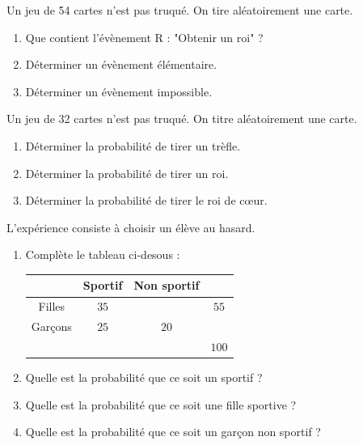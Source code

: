 \begin{pageAD} 


 
 
Un jeu de 54 cartes n'est pas truqué. On tire aléatoirement une carte.
\begin{enumerate}
\item Que contient l'évènement R : "Obtenir un roi" ?
\item Déterminer un évènement élémentaire. 
\item Déterminer un évènement impossible.
\end{enumerate}




 
 
Un jeu de 32 cartes n'est pas truqué. On titre aléatoirement une carte.
\begin{enumerate}
\item Déterminer la probabilité de tirer un trèfle.
\item Déterminer la probabilité de tirer un roi.
\item Déterminer la probabilité de tirer le roi de cœur.
\end{enumerate}
 

 
 


L'expérience consiste à choisir un élève au hasard. 

\begin{enumerate}
\item Complète le tableau ci-desous :

\begin{tabular}{|c|c|c|c|}
\hline 
 & Sportif & Non sportif &  \\ 
\hline 
Filles & $35$ &   & $55$ \\ 
\hline 
Garçons & $25$ & $20$ &  \\ 
\hline 
 &  &  & $100$ \\ 
\hline 
\end{tabular} 


\item Quelle est la probabilité que ce soit un sportif ? 
\item Quelle est la probabilité que ce soit une fille sportive ?
\item Quelle est la probabilité que ce soit un garçon non sportif ?

\end{enumerate}

 

\end{pageAD} %

